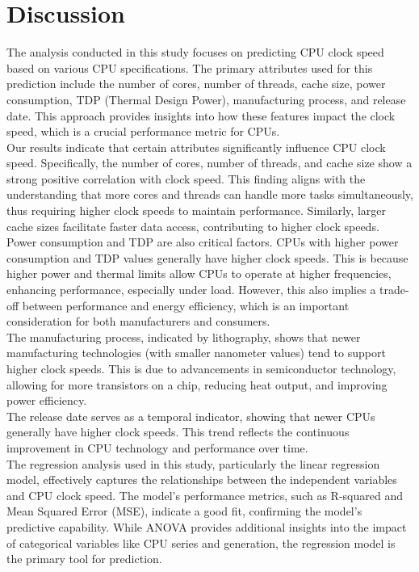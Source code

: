 \section{Discussion}

The analysis conducted in this study focuses on predicting CPU clock speed based on various CPU specifications. The primary attributes used for this prediction include the number of cores, number of threads, cache size, power consumption, TDP (Thermal Design Power), manufacturing process, and release date. This approach provides insights into how these features impact the clock speed, which is a crucial performance metric for CPUs.\\

Our results indicate that certain attributes significantly influence CPU clock speed. Specifically, the number of cores, number of threads, and cache size show a strong positive correlation with clock speed. This finding aligns with the understanding that more cores and threads can handle more tasks simultaneously, thus requiring higher clock speeds to maintain performance. Similarly, larger cache sizes facilitate faster data access, contributing to higher clock speeds.\\

Power consumption and TDP are also critical factors. CPUs with higher power consumption and TDP values generally have higher clock speeds. This is because higher power and thermal limits allow CPUs to operate at higher frequencies, enhancing performance, especially under load. However, this also implies a trade-off between performance and energy efficiency, which is an important consideration for both manufacturers and consumers.\\

The manufacturing process, indicated by lithography, shows that newer manufacturing technologies (with smaller nanometer values) tend to support higher clock speeds. This is due to advancements in semiconductor technology, allowing for more transistors on a chip, reducing heat output, and improving power efficiency.\\

The release date serves as a temporal indicator, showing that newer CPUs generally have higher clock speeds. This trend reflects the continuous improvement in CPU technology and performance over time.\\

The regression analysis used in this study, particularly the linear regression model, effectively captures the relationships between the independent variables and CPU clock speed. The model's performance metrics, such as R-squared and Mean Squared Error (MSE), indicate a good fit, confirming the model's predictive capability. While ANOVA provides additional insights into the impact of categorical variables like CPU series and generation, the regression model is the primary tool for prediction.\\

